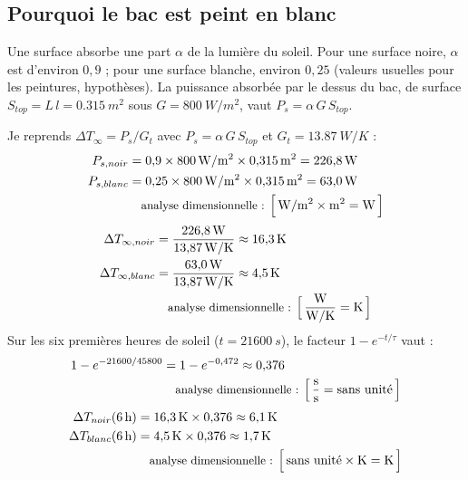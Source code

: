 \subsection{Pourquoi le bac est peint en blanc}

Une surface absorbe une part $\alpha$ de la lumière du soleil. Pour une surface noire, $\alpha$ est d'environ $0{,}9$ ; pour une surface blanche, environ $0{,}25$ (valeurs usuelles pour les peintures, hypothèses). La puissance absorbée par le dessus du bac, de surface $S_{top} = L\,l = \qty{0,315}{m^2}$ sous $G = \qty{800}{W/m^2}$, vaut $P_s = \alpha\,G\,S_{top}$.

\begin{demonstration}
Je reprends $\Delta T_{\infty} = P_s/G_t$ avec $P_s = \alpha\,G\,S_{top}$ et $G_t = \qty{13,87}{W/K}$ :
\begin{align*}
P_{s,noir} &= 0{,}9 \times \qty{800}{W/m^2} \times \qty{0,315}{m^2} = \qty{226,8}{W}\\
P_{s,blanc} &= 0{,}25 \times \qty{800}{W/m^2} \times \qty{0,315}{m^2} = \qty{63,0}{W}\\
\dimline{\unit{W/m^2}\times\unit{m^2}=\unit{W}}
\end{align*}
\begin{align*}
\Delta T_{\infty,noir} &= \frac{\qty{226,8}{W}}{\qty{13,87}{W/K}} \approx \qty{16,3}{K}\\
\Delta T_{\infty,blanc} &= \frac{\qty{63,0}{W}}{\qty{13,87}{W/K}} \approx \qty{4,5}{K}\\
\dimline{\dfrac{\unit{W}}{\unit{W/K}}=\unit{K}}
\end{align*}
Sur les six premières heures de soleil ($t = \qty{21600}{s}$), le facteur $1 - e^{-t/\tau}$ vaut :
\begin{align*}
1 - e^{-21600/45800} &= 1 - e^{-0{,}472} \approx 0{,}376\\
\dimline{\dfrac{\unit{s}}{\unit{s}}=\text{sans unité}}
\end{align*}
\begin{align*}
\Delta T_{noir}(\qty{6}{h}) &= \qty{16,3}{K} \times 0{,}376 \approx \qty{6,1}{K}\\
\Delta T_{blanc}(\qty{6}{h}) &= \qty{4,5}{K} \times 0{,}376 \approx \qty{1,7}{K}\\
\dimline{\text{sans unité}\times\unit{K}=\unit{K}}
\end{align*}
\end{demonstration}

